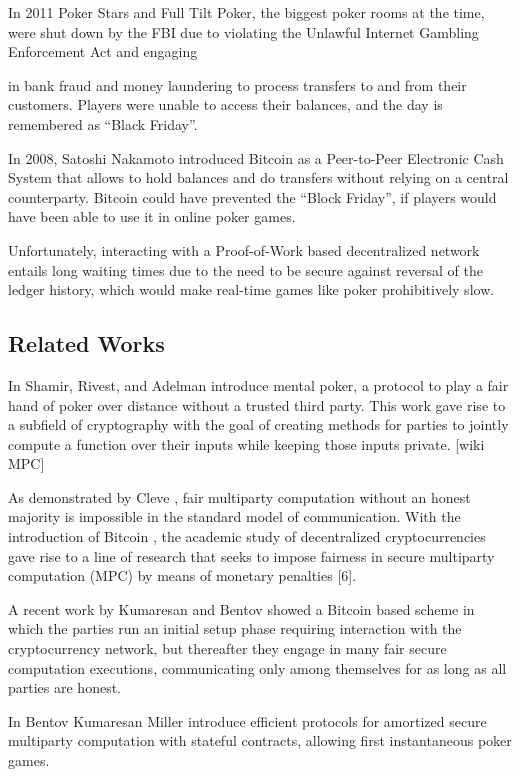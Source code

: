 In 2011 Poker Stars and Full Tilt Poker, the biggest poker rooms at the time, were shut down by the FBI due to violating the Unlawful Internet Gambling Enforcement Act \cite{treasury11} and engaging 
 
in bank fraud and money laundering to process transfers to and from their customers. Players were unable to access their balances, and the day is remembered as “Black Friday”.

In 2008, Satoshi Nakamoto introduced Bitcoin  \cite{nakamoto08} as a Peer-to-Peer Electronic Cash System that allows to hold balances and do transfers without relying on a central counterparty. Bitcoin could have prevented the “Block Friday”, if players would have been able to use it in online poker games.
 
Unfortunately, interacting with a Proof-of-Work based decentralized network entails long waiting times due to the need to be secure against reversal of the ledger history, which would make real-time games like poker prohibitively slow.


\subsection{Related Works}
In \cite{shamir81} Shamir, Rivest, and Adelman introduce mental poker, a protocol to play a fair hand of poker over distance without a trusted third party. This work gave rise to a subfield of cryptography with the goal of creating methods for parties to jointly compute a function over their inputs while keeping those inputs private. [wiki MPC]
 
As demonstrated by Cleve \cite{cleve86}, fair multiparty computation without an honest majority is impossible in the standard model of communication. With the introduction of Bitcoin \cite{nakamoto08}, the academic study of decentralized cryptocurrencies gave rise to a line of research that seeks to impose fairness in secure multiparty computation (MPC) by means of monetary penalties [6].
 
A recent work by Kumaresan and Bentov \cite{bentov14} showed a Bitcoin based scheme in which the parties run an initial setup phase requiring interaction with the cryptocurrency network, but thereafter they engage in many fair secure computation executions, communicating only among themselves for as long as all parties are honest.
 
In \cite{bentov17} Bentov Kumaresan Miller introduce efficient protocols for amortized secure multiparty computation with  stateful contracts, allowing first instantaneous poker games. 

